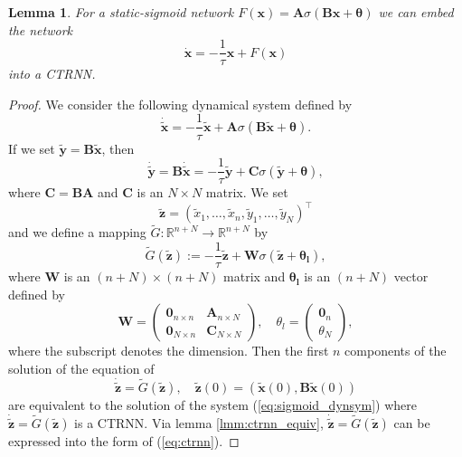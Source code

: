 \documentclass[11pt, letterpaper]{article}
\newtheorem{lemma}[theorem]{Lemma}
\begin{document}
\begin{lemma}\label{lmm:embed_ctrnn}
    For a static-sigmoid network $F(\mathbf{x}) = \mathbf{A}\sigma(\mathbf{B}\mathbf{x}+\mathbf{\theta})$ we can embed the network \[\dot{\mathbf{x}}=-\frac{1}{\tau}\mathbf{x}+F(\mathbf{x})\] into a CTRNN.
\end{lemma}
\begin{proof}
We consider the following dynamical system defined by
\begin{equation}\label{eq:sigmoid_dynsym}
    \dot{\tilde{\mathbf{x}}} = -\frac{1}{\tau}\tilde{\mathbf{x}} + \mathbf{A}\sigma(\mathbf{B}\tilde{\mathbf{x}}+\mathbf{\theta}).
\end{equation}
If we set $\tilde{\mathbf{y}}=\mathbf{B}\tilde{\mathbf{x}}$, then
\begin{equation*}
    \dot{\tilde{\mathbf{y}}} = \mathbf{B}\dot{\tilde{\mathbf{x}}} = -\frac{1}{\tau}\tilde{\mathbf{y}} + \mathbf{C}\sigma(\tilde{\mathbf{y}}+\mathbf{\theta}),
\end{equation*}
where $\mathbf{C}=\mathbf{B}\mathbf{A}$ and $\mathbf{C}$ is an $N\times N$ matrix. We set
\begin{equation*}
    \tilde{\mathbf{z}}=\left( \tilde{x}_1,\ldots,\tilde{x}_n,\tilde{y}_1,\ldots,\tilde{y}_N \right)^\top
\end{equation*}
and we define a mapping $\tilde{G}:\mathbb{R}^{n+N}\to\mathbb{R}^{n+N}$ by
\begin{equation}
    \tilde{G}(\tilde{\mathbf{z}}) := -\frac{1}{\tau}\tilde{\mathbf{z}} + \mathbf{W}\sigma(\tilde{\mathbf{z}}+\mathbf{\theta_l}),
\end{equation}
where $\mathbf{W}$ is an $(n+N)\times(n+N)$ matrix and $\mathbf{\theta_l}$ is an $(n+N)$ vector defined by
\begin{equation*}
    \mathbf{W}=\begin{pmatrix}\mathbf{0}_{n\times n} & \mathbf{A}_{n\times N}\\\mathbf{0}_{N\times n} & \mathbf{C}_{N\times N}\end{pmatrix}, \quad\theta_l=\begin{pmatrix}\mathbf{0}_n\\ \theta_N\end{pmatrix},
\end{equation*}
where the subscript denotes the dimension. Then the first $n$ components of the solution of the equation of 
\begin{equation*}
    \dot{\tilde{\mathbf{z}}} = \tilde{G}(\tilde{\mathbf{z}}),\quad \tilde{\mathbf{z}}(0)=\left(\tilde{\mathbf{x}}(0), \mathbf{B}\tilde{\mathbf{x}}(0)\right)
\end{equation*}
are equivalent to the solution of the system (\ref{eq:sigmoid_dynsym}) where $\dot{\tilde{\mathbf{z}}} = \tilde{G}(\tilde{\mathbf{z}})$ is a CTRNN. Via lemma \ref{lmm:ctrnn_equiv}, $\dot{\tilde{\mathbf{z}}} = \tilde{G}(\tilde{\mathbf{z}})$ can be expressed into the form of (\ref{eq:ctrnn}).
\end{proof}
\end{document}
